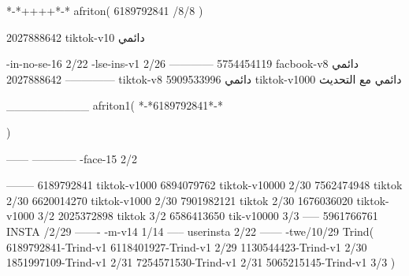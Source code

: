 *-*++++*-*
afriton(
6189792841 /8/8
)

2027888642 tiktok-v10
دائمي

-in-no-se-16 2/22
-lse-ins-v1 2/26
------------
5754454119 facbook-v8
دائمي
--------------
2027888642 tiktok-v8
دائمي
5909533996 tiktok-v1000
دائمي مع التحديث

__________
afriton1(
*-*6189792841*-*

)


------
------------
-face-15 2/2

--------
6189792841 tiktok-v1000
6894079762 tiktok-v10000 2/30
7562474948 tiktok 2/30
6620014270 tiktok-v1000 2/30
7901982121 tiktok 2/30
1676036020 tiktok-v1000 3/2
2025372898 tiktok  3/2
6586413650 tik-v10000 3/3
-----
5961766761 INSTA /2/29
-------
-m-v14 1/14
-----
userinsta 2/22
------
-twe/10/29
Trind(
6189792841-Trind-v1 
6118401927-Trind-v1 2/29
1130544423-Trind-v1 2/30
1851997109-Trind-v1 2/31
7254571530-Trind-v1 2/31
5065215145-Trind-v1 3/3
)
